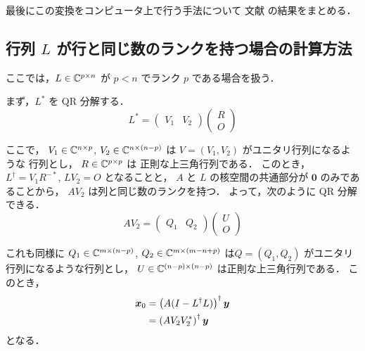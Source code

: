 最後にこの変換をコンピュータ上で行う手法について
文献 \cite{Elden1982, Hansen1994} の結果をまとめる．

\subsection[行列 L が行と同じ数のランクを持つ場合の計算方法]{行列 $L$ が行と同じ数のランクを持つ場合の計算方法}

ここでは，$L \in \mathbb{C}^{p \times n}$ が $p < n$ でランク $p$ である場合を扱う．

まず，$L^*$ を QR 分解する．
\begin{equation}
    L^* = \begin{pmatrix}
        V_1 & V_2
    \end{pmatrix}\begin{pmatrix}
        R \\ O
    \end{pmatrix}
\end{equation}

ここで，
$V_1 \in \mathbb{C}^{n \times p}$,
$V_2 \in \mathbb{C}^{n \times (n-p)}$
は $V = (V_1, V_2)$ がユニタリ行列になるような
行列とし，
$R \in \mathbb{C}^{p \times p}$ は
正則な上三角行列である．
このとき，$L^\dagger = V_1 R^{-*}$, $LV_2 = O$ となることと，
$A$ と $L$ の核空間の共通部分が $\bm{0}$ のみであることから，
$AV_2$ は列と同じ数のランクを持つ．
よって，次のように QR 分解できる．
\begin{equation}
    AV_2 = \begin{pmatrix}
        Q_1 & Q_2
    \end{pmatrix}\begin{pmatrix}
        U \\ O
    \end{pmatrix}
\end{equation}

これも同様に
$Q_1 \in \mathbb{C}^{m \times (n-p)}$,
$Q_2 \in \mathbb{C}^{m \times (m-n+p)}$
は$Q = (Q_1, Q_2)$ がユニタリ行列になるような行列とし，
$U \in \mathbb{C}^{(n - p) \times (n - p)}$
は正則な上三角行列である．
このとき，
\begin{align}
    \bm{x}_0 & = \left(A (I - L^\dagger L)\right)^\dagger \bm{y} \notag \\
             & = \left(A V_2 V_2^*\right)^\dagger \bm{y}
\end{align}
となる．

